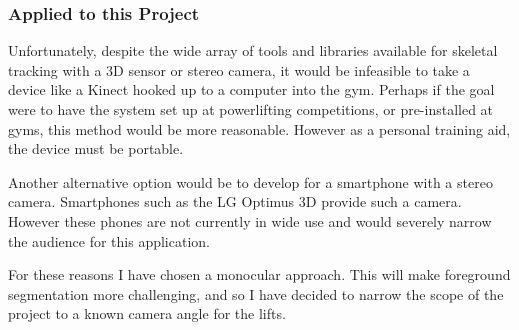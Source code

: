 \subsubsection{Applied to this Project}

Unfortunately, despite the wide array of tools and libraries available for skeletal tracking with a 3D sensor or stereo camera, it would be infeasible to take a device like a Kinect hooked up to a computer into the gym. Perhaps if the goal were to have the system set up at powerlifting competitions, or pre-installed at gyms, this method would be more reasonable. However as a personal training aid, the device must be portable.

Another alternative option would be to develop for a smartphone with a stereo camera. Smartphones such as the LG Optimus 3D\cite{lgoptimus} provide such a camera. However these phones are not currently in wide use and would severely narrow the audience for this application.

For these reasons I have chosen a monocular approach. This will make foreground segmentation more challenging, and so I have decided to narrow the scope of the project to a known camera angle for the lifts.